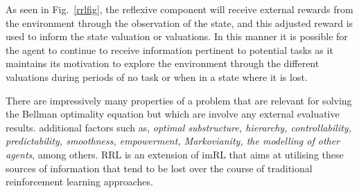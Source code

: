 \documentclass{article}
\begin{document}
As seen in Fig.~\ref{rrlfig}, the reflexive component will receive external rewards from the environment through the observation of the state, and this adjusted reward is used to inform the state valuation or valuations. In this manner it is possible for the agent to continue to receive information pertinent to potential tasks as it maintains its motivation to explore the environment through the different valuations during periods of no task or when in a state where it is lost.



There are impressively many properties of a problem that are relevant for solving the 
Bellman optimality equation but which are involve any external evaluative results.
additional factors such as, \emph{optimal substructure, hierarchy, controllability, predictability, smoothness, empowerment, Markovianity, the modelling of other agents}, among others. RRL is an extension of imRL that aims at utilising these sources of information that tend to be lost over the course of traditional reinforcement learning approaches. 
\end{document}
